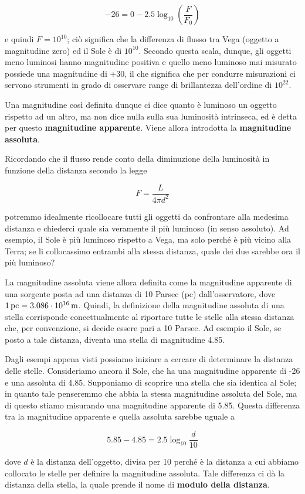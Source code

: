 $$-26=0-2.5\log_{10} \left( \frac{F}{F_0} \right)$$

e quindi $F = 10^{10}$; ciò significa che la differenza di flusso tra Vega (oggetto a magnitudine zero) ed il Sole è di $10^{10}$. Secondo questa scala, dunque, gli oggetti meno luminosi hanno magnitudine positiva e quello meno luminoso mai misurato possiede una magnitudine di +30, il che significa che per condurre misurazioni ci servono strumenti in grado di osservare range di brillantezza dell'ordine di $10^{22}$.

Una magnitudine così definita dunque ci dice quanto è luminoso un oggetto rispetto ad un altro, ma non dice nulla sulla sua luminosità intrinseca, ed è detta per questo \textbf{magnitudine apparente}. Viene allora introdotta la \textbf{magnitudine assoluta}.

Ricordando che il flusso rende conto della diminuzione della luminosità in funzione della distanza secondo la legge

\begin{equation*}
    F = \frac{L}{4\pi d^2}
\end{equation*}

potremmo idealmente ricollocare tutti gli oggetti da confrontare alla medesima distanza e chiederci quale sia veramente il più luminoso (in senso assoluto). Ad esempio, il Sole è più luminoso rispetto a Vega, ma solo perché è più vicino alla Terra; se li collocassimo entrambi alla stessa distanza, quale dei due sarebbe ora il più luminoso?

La magnitudine assoluta viene allora definita come la magnitudine apparente di una sorgente posta ad una distanza di 10 Parsec (pc) dall'osservatore, dove $\rm 1 \, pc=3.086 \cdot 10^{16} \,m$. Quindi, la definizione della magnitudine assoluta di una stella corrisponde concettualmente al riportare tutte le stelle alla stessa distanza che, per convenzione, si decide essere pari a 10 Parsec. Ad esempio il Sole, se posto a tale distanza, diventa una stella di magnitudine 4.85.

\vspace{0.2cm}Dagli esempi appena visti possiamo iniziare a cercare di determinare la distanza delle stelle. Consideriamo ancora il Sole, che ha una magnitudine apparente di -26 e una assoluta di 4.85. Supponiamo di scoprire una stella che sia identica al Sole; in quanto tale penseremmo che abbia la stessa magnitudine assoluta del Sole, ma di questo stiamo misurando una magnitudine apparente di 5.85. Questa differenza tra la magnitudine apparente e quella assoluta sarebbe uguale a

$$5.85-4.85=2.5 \log_{10} \frac{d}{10}$$

dove $d$ è la distanza dell'oggetto, divisa per 10 perché è la distanza a cui abbiamo collocato le stelle per definire la magnitudine assoluta. Tale differenza ci dà la distanza della stella, la quale prende il nome di \textbf{modulo della distanza}.